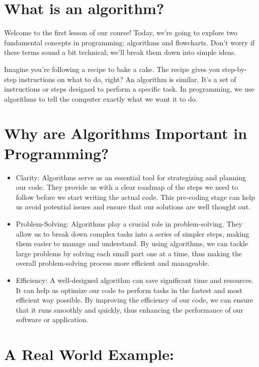 \documentclass[
]{book}
\begin{document}
\hypertarget{what-is-an-algorithm}{%
\section{What is an algorithm?}\label{what-is-an-algorithm}}

Welcome to the first lesson of our course! Today, we're going to explore two fundamental concepts in programming: algorithms and flowcharts. Don't worry if these terms sound a bit technical; we'll break them down into simple ideas.

Imagine you're following a recipe to bake a cake. The recipe gives you step-by-step instructions on what to do, right? An algorithm is similar. It's a set of instructions or steps designed to perform a specific task. In programming, we use algorithms to tell the computer exactly what we want it to do.

\hypertarget{why-are-algorithms-important-in-programming}{%
\section{Why are Algorithms Important in Programming?}\label{why-are-algorithms-important-in-programming}}

\begin{itemize}
\item
  Clarity: Algorithms serve as an essential tool for strategizing and planning our code. They provide us with a clear roadmap of the steps we need to follow before we start writing the actual code. This pre-coding stage can help us avoid potential issues and ensure that our solutions are well thought out.
\item
  Problem-Solving: Algorithms play a crucial role in problem-solving. They allow us to break down complex tasks into a series of simpler steps, making them easier to manage and understand. By using algorithms, we can tackle large problems by solving each small part one at a time, thus making the overall problem-solving process more efficient and manageable.
\item
  Efficiency: A well-designed algorithm can save significant time and resources. It can help us optimize our code to perform tasks in the fastest and most efficient way possible. By improving the efficiency of our code, we can ensure that it runs smoothly and quickly, thus enhancing the performance of our software or application.
\end{itemize}

\hypertarget{a-real-world-example}{%
\section{A Real World Example:}\label{a-real-world-example}}
\end{document}
